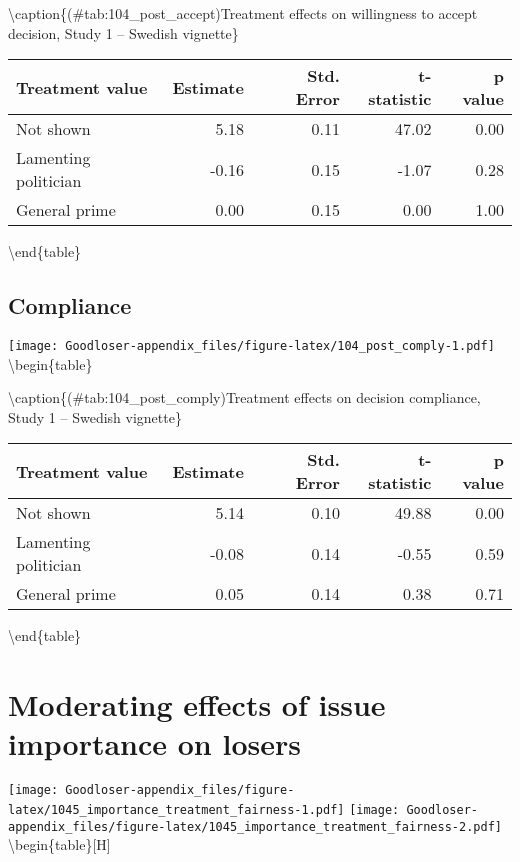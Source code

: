 \documentclass[
]{book}
\begin{document}
\textbackslash caption\{(\#tab:104\_post\_accept)Treatment effects on willingness to accept decision, Study 1 -- Swedish vignette\}
\centering

\begin{tabular}[t]{lrrrr}
\toprule
Treatment value & Estimate & Std. Error & t-statistic & p value\\
\midrule
Not shown & 5.18 & 0.11 & 47.02 & 0.00\\
Lamenting politician & -0.16 & 0.15 & -1.07 & 0.28\\
General prime & 0.00 & 0.15 & 0.00 & 1.00\\
\bottomrule
\end{tabular}

\textbackslash end\{table\}

\hypertarget{compliance}{%
\section{Compliance}\label{compliance}}

\texttt{[image: Goodloser-appendix\_files/figure-latex/104\_post\_comply-1.pdf]} \textbackslash begin\{table\}

\textbackslash caption\{(\#tab:104\_post\_comply)Treatment effects on decision compliance, Study 1 -- Swedish vignette\}
\centering

\begin{tabular}[t]{lrrrr}
\toprule
Treatment value & Estimate & Std. Error & t-statistic & p value\\
\midrule
Not shown & 5.14 & 0.10 & 49.88 & 0.00\\
Lamenting politician & -0.08 & 0.14 & -0.55 & 0.59\\
General prime & 0.05 & 0.14 & 0.38 & 0.71\\
\bottomrule
\end{tabular}

\textbackslash end\{table\}

\hypertarget{moderating-effects-of-issue-importance-on-losers}{%
\chapter{Moderating effects of issue importance on losers}\label{moderating-effects-of-issue-importance-on-losers}}

\texttt{[image: Goodloser-appendix\_files/figure-latex/1045\_importance\_treatment\_fairness-1.pdf]} \texttt{[image: Goodloser-appendix\_files/figure-latex/1045\_importance\_treatment\_fairness-2.pdf]} \textbackslash begin\{table\}{[}H{]}
\end{document}
